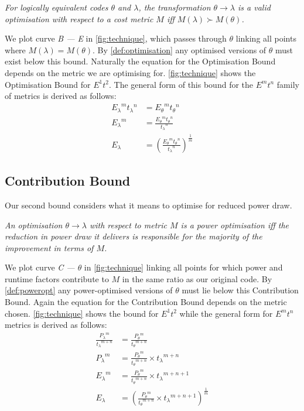 \begin{definition}
\textit{For logically equivalent codes $\theta$ and $\lambda$, the transformation ${\theta \to \lambda}$ is a valid optimisation with respect to a cost metric $M$ iff ${M(\lambda) \succ M(\theta)}$.}
\label{def:optimisation}
\end{definition}

\noindent
We plot curve \emph{B --- E} in \autoref{fig:technique}, which passes through $\theta$ linking all points where ${M(\lambda) = M(\theta)}$. 
By \autoref{def:optimisation} any optimised versions of $\theta$ must exist below this bound.
Naturally the equation for the Optimisation Bound depends on the metric we are optimising for.
\autoref{fig:technique} shows the Optimisation Bound for $E^1t^2$.
The general form of this bound for the $E^mt^n$ family of metrics is derived as follows:
\begin{align}
 {E_\lambda}^m{t_\lambda}^n &= {E_\theta}^m{t_\theta}^n \nonumber \\
 {E_\lambda}^m &= \frac{{E_\theta}^m{t_\theta}^n}{{t_\lambda}^n} \nonumber \\
  E_\lambda &= (\frac{{E_\theta}^m{t_\theta}^n}{{t_\lambda}^n})^\frac{1}{m}
\label{eq:optimisation}
\end{align}

\subsection{Contribution Bound}
\noindent
Our second bound considers what it means to optimise for reduced power draw.
\begin{definition}
\textit{An optimisation $\theta \to \lambda$ with respect to metric $M$ is a power optimisation iff the reduction in power draw it delivers is responsible for the majority of the improvement in terms of $M$.}
\label{def:poweropt}
\end{definition}

\noindent
We plot curve \emph{C --- $\theta$} in \autoref{fig:technique} linking all points for which power and runtime factors contribute to $M$ in the same ratio as our original code.
By \autoref{def:poweropt} any power-optimised versions of $\theta$ must lie below this Contribution Bound.
Again the equation for the Contribution Bound depends on the metric chosen. 
\autoref{fig:technique} shows the bound for $E^1t^2$ while the general form for $E^mt^n$ metrics is derived as follows:
\begin{align}
\frac{{P_{\lambda}}^m}{{t_{\lambda}}^{m+n}} &= \frac{{P_{\theta}}^m}{{t_{\theta}}^{m+n}} \nonumber \\
 {P_{\lambda}}^m &= \frac{{P_{\theta}}^m}{{t_{\theta}}^{m+n}} \times {t_\lambda}^{m+n} \nonumber \\ 
 {E_{\lambda}}^m &= \frac{{P_{\theta}}^m}{{t_{\theta}}^{m+n}} \times {t_\lambda}^{m+n+1} \nonumber \\ 
  E_{\lambda} &= (\frac{{P_{\theta}}^m}{{t_{\theta}}^{m+n}} \times {t_\lambda}^{m+n+1})^{\frac{1}{m}} 
\end{align}

